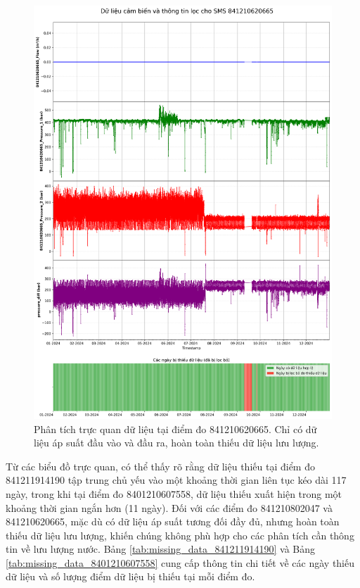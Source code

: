 \begin{figure}[H]
    \centering
    \includegraphics[width=\textwidth]{image/section6_1/timeseries_combined_841210620665.png}
    \caption{Phân tích trực quan dữ liệu tại điểm đo 841210620665. Chỉ có dữ liệu áp suất đầu vào và đầu ra, hoàn toàn thiếu dữ liệu lưu lượng.}
    \label{fig:no_flow_data_841210620665}
\end{figure}

Từ các biểu đồ trực quan, có thể thấy rõ rằng dữ liệu thiếu tại điểm đo 841211914190 tập trung chủ yếu vào một khoảng thời gian liên tục kéo dài 117 ngày, trong khi tại điểm đo 8401210607558, dữ liệu thiếu xuất hiện trong một khoảng thời gian ngắn hơn (11 ngày). Đối với các điểm đo 841210802047 và 841210620665, mặc dù có dữ liệu áp suất tương đối đầy đủ, nhưng hoàn toàn thiếu dữ liệu lưu lượng, khiến chúng không phù hợp cho các phân tích cần thông tin về lưu lượng nước. Bảng \ref{tab:missing_data_841211914190} và Bảng \ref{tab:missing_data_8401210607558} cung cấp thông tin chi tiết về các ngày thiếu dữ liệu và số lượng điểm dữ liệu bị thiếu tại mỗi điểm đo.

